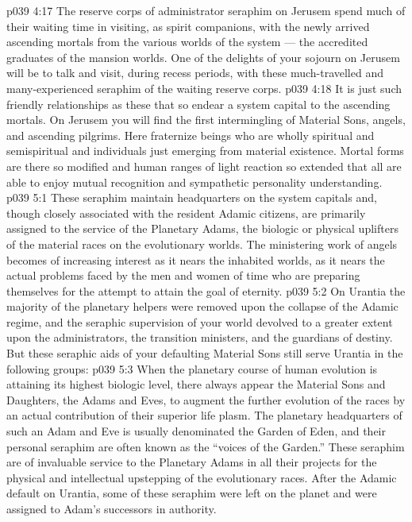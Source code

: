 \vs p039 4:17 \bibnobreakspace {} The reserve corps of administrator seraphim on Jerusem spend much of their waiting time in visiting, as spirit companions, with the newly arrived ascending mortals from the various worlds of the system --- the accredited graduates of the mansion worlds. One of the delights of your sojourn on Jerusem will be to talk and visit, during recess periods, with these much\hyp{}travelled and many\hyp{}experienced seraphim of the waiting reserve corps.
\vs p039 4:18 It is just such friendly relationships as these that so endear a system capital to the ascending mortals. On Jerusem you will find the first intermingling of Material Sons, angels, and ascending pilgrims. Here fraternize beings who are wholly spiritual and semispiritual and individuals just emerging from material existence. Mortal forms are there so modified and human ranges of light reaction so extended that all are able to enjoy mutual recognition and sympathetic personality understanding.
\vs p039 5:1 These seraphim maintain headquarters on the system capitals and, though closely associated with the resident Adamic citizens, are primarily assigned to the service of the Planetary Adams, the biologic or physical uplifters of the material races on the evolutionary worlds. The ministering work of angels becomes of increasing interest as it nears the inhabited worlds, as it nears the actual problems faced by the men and women of time who are preparing themselves for the attempt to attain the goal of eternity.
\vs p039 5:2 On Urantia the majority of the planetary helpers were removed upon the collapse of the Adamic regime, and the seraphic supervision of your world devolved to a greater extent upon the administrators, the transition ministers, and the guardians of destiny. But these seraphic aids of your defaulting Material Sons still serve Urantia in the following groups:
\vs p039 5:3 \bibnobreakspace {} When the planetary course of human evolution is attaining its highest biologic level, there always appear the Material Sons and Daughters, the Adams and Eves, to augment the further evolution of the races by an actual contribution of their superior life plasm. The planetary headquarters of such an Adam and Eve is usually denominated the Garden of Eden, and their personal seraphim are often known as the “voices of the Garden.” These seraphim are of invaluable service to the Planetary Adams in all their projects for the physical and intellectual upstepping of the evolutionary races. After the Adamic default on Urantia, some of these seraphim were left on the planet and were assigned to Adam’s successors in authority.
